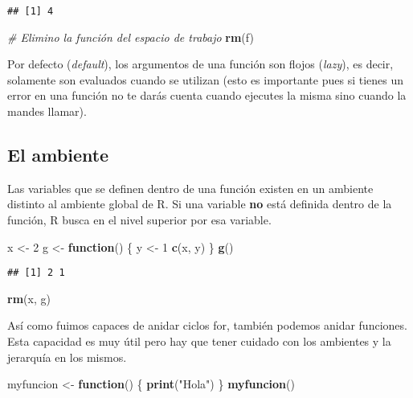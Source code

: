 \documentclass[]{article}
\newenvironment{Shaded}{\begin{snugshade}}{\end{snugshade}}
\newcommand{\KeywordTok}[1]{\textcolor[rgb]{0.13,0.29,0.53}{\textbf{#1}}}
\newcommand{\DecValTok}[1]{\textcolor[rgb]{0.00,0.00,0.81}{#1}}
\newcommand{\StringTok}[1]{\textcolor[rgb]{0.31,0.60,0.02}{#1}}
\newcommand{\CommentTok}[1]{\textcolor[rgb]{0.56,0.35,0.01}{\textit{#1}}}
\newcommand{\ControlFlowTok}[1]{\textcolor[rgb]{0.13,0.29,0.53}{\textbf{#1}}}
\newcommand{\NormalTok}[1]{#1}
\begin{document}
\begin{verbatim}
## [1] 4
\end{verbatim}

\begin{Shaded}
\begin{Highlighting}[]
\CommentTok{# Elimino la función del espacio de trabajo}
\KeywordTok{rm}\NormalTok{(f)}
\end{Highlighting}
\end{Shaded}

Por defecto (\emph{default}), los argumentos de una función son flojos
(\emph{lazy}), es decir, solamente son evaluados cuando se utilizan
(esto es importante pues si tienes un error en una función no te darás
cuenta cuando ejecutes la misma sino cuando la mandes llamar).

\subsection{El ambiente}\label{el-ambiente}

Las variables que se definen dentro de una función existen en un
ambiente distinto al ambiente global de R. Si una variable \textbf{no}
está definida dentro de la función, R busca en el nivel superior por esa
variable.

\begin{Shaded}
\begin{Highlighting}[]
\NormalTok{x <-}\StringTok{ }\DecValTok{2}
\NormalTok{g <-}\StringTok{ }\ControlFlowTok{function}\NormalTok{() \{}
\NormalTok{    y <-}\StringTok{ }\DecValTok{1}
    \KeywordTok{c}\NormalTok{(x, y)}
\NormalTok{\}}
\KeywordTok{g}\NormalTok{()}
\end{Highlighting}
\end{Shaded}

\begin{verbatim}
## [1] 2 1
\end{verbatim}

\begin{Shaded}
\begin{Highlighting}[]
\KeywordTok{rm}\NormalTok{(x, g)}
\end{Highlighting}
\end{Shaded}

Así como fuimos capaces de anidar ciclos for, también podemos anidar
funciones. Esta capacidad es muy útil pero hay que tener cuidado con los
ambientes y la jerarquía en los mismos.

\begin{Shaded}
\begin{Highlighting}[]
\NormalTok{myfuncion <-}\StringTok{ }\ControlFlowTok{function}\NormalTok{() \{}
  \KeywordTok{print}\NormalTok{(}\StringTok{"Hola"}\NormalTok{)}
\NormalTok{\}}
\KeywordTok{myfuncion}\NormalTok{()}
\end{Highlighting}
\end{Shaded}
\end{document}
